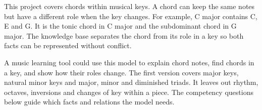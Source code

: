 This project covers chords within musical keys. A chord can keep the same notes
but have a different role when the key changes. For example, C major contains
C, E and G. It is the tonic chord in C major and the subdominant chord in G major.
The knowledge base separates the chord from its role in a key so both facts can
be represented without conflict.

A music learning tool could use this model to explain chord notes, find chords
in a key, and show how their roles change. The first version covers major keys,
natural minor keys and major, minor and diminished triads. It leaves out rhythm,
octaves, inversions and changes of key within a piece. The competency questions
below guide which facts and relations the model needs.
